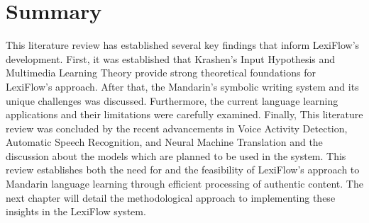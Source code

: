 \documentclass[oneside]{utmthesis}
\begin{document}
\section{Summary}
This literature review has established several key findings that inform LexiFlow's development. First, it was established that Krashen's Input Hypothesis and Multimedia Learning Theory provide strong theoretical foundations for LexiFlow's approach. After that, the Mandarin's symbolic writing system and its unique challenges was discussed. Furthermore, the current language learning applications and their limitations were carefully examined. Finally, This literature review was concluded by the recent advancements in Voice Activity Detection, Automatic Speech Recognition, and Neural Machine Translation and the discussion about the models which are planned to be used in the system.
This review establishes both the need for and the feasibility of LexiFlow's approach to Mandarin language learning through efficient processing of authentic content. The next chapter will detail the methodological approach to implementing these insights in the LexiFlow system.
\end{document}
